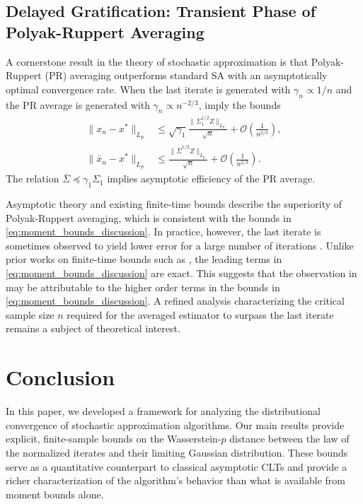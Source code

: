 \documentclass[11pt]{article}
\begin{document}
\subsection{Delayed Gratification: Transient Phase of Polyak-Ruppert Averaging}\label{disc:fast_rates}
A cornerstone result in the theory of stochastic approximation is that Polyak-Ruppert (PR) averaging outperforms standard SA with an asymptotically optimal convergence rate. 
When the last iterate is generated with \stepsize $\gamma_n \propto 1/n$ and the PR average is generated with \stepsize $\gamma_n \propto n^{-2/3}$,  imply the bounds
\begin{equation}\label{eq:moment_bounds_discussion}
\begin{split}
    \lVert x_n - x^* \rVert_{L_p} 
    &\leq \sqrt{\gamma_1} \frac{\lVert \Sigma_1^{1/2} Z \rVert_{L_p}}{\sqrt{n}} + \mathcal{O}\left( \frac{1}{n^{2/3}} \right), 
    \\ 
    \lVert \bar{x}_n - x^* \rVert_{L_p} &\leq 
    \frac{\lVert \bar{\Sigma}^{1/2}Z \rVert_{L_p}}{\sqrt{n}} + \mathcal{O}\left(\frac{1}{n^{2/3}} \right) .     
\end{split}    
\end{equation}
The relation $\bar{\Sigma} \preceq \gamma_1 \Sigma_1$ implies asymptotic efficiency of the PR average. 



Asymptotic theory and existing finite-time bounds describe the superiority of Polyak-Ruppert averaging, which is consistent with the bounds in \eqref{eq:moment_bounds_discussion}. 
In practice, however, the last iterate is sometimes observed to yield lower error for a large number of iterations \citep{moulines_bach}. 
Unlike prior works on finite-time bounds such as \citep{haque2023tightfinitetimebounds}, the leading terms in \eqref{eq:moment_bounds_discussion} are exact. 
This suggests that the observation in \citep{moulines_bach} may be attributable to the higher order terms in the bounds in \eqref{eq:moment_bounds_discussion}.
A refined analysis characterizing the critical sample size $n$ required for the averaged estimator to surpass the last iterate remains a subject of theoretical interest.
















\section{Conclusion}
In this paper, we developed a \nonasymptotic framework for analyzing the distributional convergence of \nonlinear stochastic approximation algorithms. 
Our main results provide explicit, finite-sample bounds on the Wasserstein-$p$ distance between the law of the normalized iterates and their limiting Gaussian distribution. 
These bounds serve as a quantitative counterpart to classical asymptotic CLTs and provide a richer characterization of the algorithm's behavior than what is available from moment bounds alone.
\end{document}
